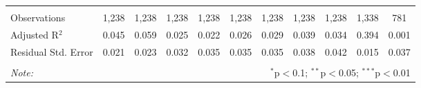 \begin{table}[!htbp]
\begin{adjustbox}{width=1.35\textwidth}
\begin{tabular}{@{\extracolsep{5pt}}lcccccccccc}
\hline \\[-1.8ex] 
Observations & 1,238 & 1,238 & 1,238 & 1,238 & 1,238 & 1,238 & 1,238 & 1,238 & 1,338 & 781 \\ 
Adjusted R$^{2}$ & 0.045 & 0.059 & 0.025 & 0.022 & 0.026 & 0.029 & 0.039 & 0.034 & 0.394 & 0.001 \\ 
Residual Std. Error & 0.021 & 0.023 & 0.032 & 0.035 & 0.035 & 0.035 & 0.038 & 0.042 & 0.015 & 0.037 \\ 
\hline 
\hline \\[-1.8ex] 
\textit{Note:}  & \multicolumn{10}{r}{$^{*}$p$<$0.1; $^{**}$p$<$0.05; $^{***}$p$<$0.01} \\ 
\end{tabular} 
\end{adjustbox}
\end{table} 
